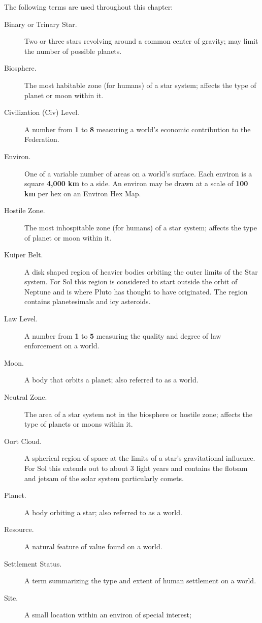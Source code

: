 The following terms are used throughout this chapter: 

\begin{description}
\item[Binary or Trinary Star.] Two or three stars revolving around a
  common center of gravity; may limit the number of possible planets. 
\item[Biosphere.] The most habitable zone (for humans) of a star system;
affects the type of planet or moon within it. 
\item[Civilization (Civ) Level.] A number from \textbf{1} to
  \textbf{8} measuring a world's economic contribution to the
  Federation.
\item[Environ.] One of a variable number of areas on a world's
  surface. Each environ is a square \textbf{4,000 km} to a side. An
  environ may be drawn at a scale of \textbf{100 km} per hex on an
  Environ Hex Map.
\item[Hostile Zone.] The most inhospitable zone (for humans) of a star
  system; affects the type of planet or moon within it. 
\item[Kuiper Belt.] A disk shaped region of heavier bodies orbiting
  the outer limits of the Star system. For Sol this region is
  considered to start outside the orbit of Neptune and is where Pluto
  has thought to have originated. The region contains planetesimals
  and icy asteroids.
\item[Law Level.] A number from \textbf{1} to \textbf{5} measuring the
  quality and degree of law enforcement on a world.
\item[Moon.] A body that orbits a planet; also referred to as a
  world.
\item[Neutral Zone.] The area of a star system not in the biosphere or
  hostile zone; affects the type of planets or moons within it.
\item[Oort Cloud.] A spherical region of space at the limits of a
  star's gravitational influence. For Sol this extends out to about 3
  light years and contains the flotsam and jetsam of the solar system
  particularly comets.
\item[Planet.] A body orbiting a star; also referred to as a world.
\item[Resource.] A natural feature of value found on a world.
\item[Settlement Status.] A term summarizing the type and extent of
  human settlement on a world.
\item[Site.] A small location within an environ of special interest;

\end{description}
